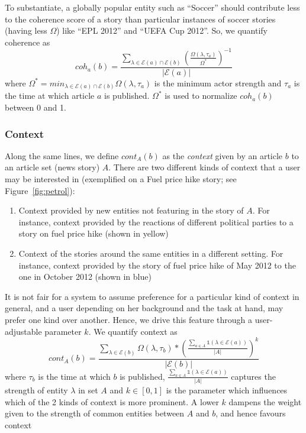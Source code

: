 To substantiate, a globally popular entity such as ``Soccer'' should contribute less to the coherence score
of a story than particular instances of soccer stories (having less $\Omega$) like ``EPL 2012'' and ``UEFA Cup 2012''. So, we quantify coherence as
\begin{equation}
coh_{a}(b) = \frac{\sum_{\lambda \in \mathcal{E}(a) \cap \mathcal{E}(b)}{(\frac{\Omega(\lambda, \tau_a)}{\Omega^{*}})^{-1}}}{|\mathcal{E}(a)|}
\end{equation}
where $\Omega^{*}=min_{\lambda \in \mathcal{E}(a) \cap \mathcal{E}(b)}{\Omega(\lambda, \tau_a)}$ is the minimum actor strength and $\tau_a$ is the time at which article $a$ is published. 
$\Omega^{*}$ is used to normalize $coh_a(b)$ between 0 and 1.

\subsubsection*{Context}
Along the same lines, we define $cont_{A}(b)$ as the \emph{context} given by an article $b$ to an article set (news story) $A$. There are two different kinds of context that a user may be interested in (exemplified on a Fuel price hike story; see Figure~\ref{fig:petrol}):
\begin{enumerate}
\item Context provided by new entities not featuring in the story of $A$. For instance, context provided by the reactions of different political parties to a story on fuel price hike (shown in yellow)
\item Context of the stories around the same entities in a different setting. For instance, context provided by the story of fuel price hike of May 2012 to the one in October 2012 (shown in blue)
\end{enumerate}
It is not fair for a system to assume preference for a particular kind of context in general, and a user depending on her background and the task at hand, may prefer one kind over another. Hence, we drive this feature through a user-adjustable parameter $k$. 
We quantify context as
\begin{equation}
cont_{A}(b) = \frac{\sum_{\lambda \in \mathcal{E}(b)}{\Omega(\lambda, \tau_b)*(\frac{\sum_{a \in A}\mathbb{1}(\lambda \in \mathcal{E}(a))}{|A|})^{k}}}{|\mathcal{E}(b)|}
\end{equation}
where $\tau_b$ is the time at which $b$ is published, $\frac{\sum_{a \in A}\mathbb{1}(\lambda \in \mathcal{E}(a))}{|A|}$ captures the strength of entity $\lambda$ in set $A$ and $k \in [0, 1]$ is the parameter which influences which of the 2 kinds of context is more prominent. A lower $k$ dampens the weight given to the strength of common entities between $A$ and $b$, and hence favours context 
